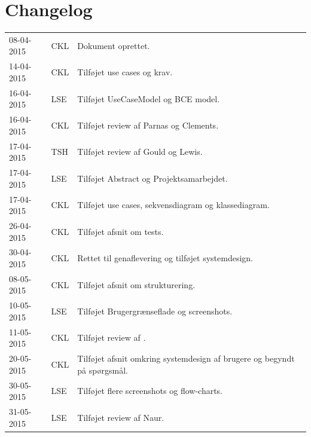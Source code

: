 \documentclass[11pt, a4paper]{article}
\begin{document}
\section{Changelog}
\label{sec:changelog}
\begin{tabular}{l l l}
08-04-2015 & CKL & Dokument oprettet. \\
14-04-2015 & CKL & Tilføjet use cases og krav. \\
16-04-2015 & LSE & Tilføjet UseCaseModel og BCE model. \\
16-04-2015 & CKL & Tilføjet review af Parnas og Clements. \\
17-04-2015 & TSH & Tilføjet review af Gould og Lewis. \\
17-04-2015 & LSE & Tilføjet Abstract og Projektsamarbejdet. \\
17-04-2015 & CKL & Tilføjet use cases, sekvensdiagram og klassediagram. \\
26-04-2015 & CKL & Tilføjet afsnit om tests. \\
30-04-2015 & CKL & Rettet til genaflevering og tilføjet systemdesign. \\
08-05-2015 & CKL & Tilføjet afsnit om strukturering. \\
10-05-2015 & LSE & Tilføjet Brugergrænseflade og screenshots. \\
11-05-2015 & CKL & Tilføjet review af \cite{nsbullet}. \\
20-05-2015 & CKL & Tilføjet afsnit omkring systemdesign af brugere og begyndt på spørgsmål. \\
30-05-2015 & LSE & Tilføjet flere screenshots og flow-charts. \\
31-05-2015 & LSE & Tilføjet review af Naur. \\
\end{tabular}
\end{document}
